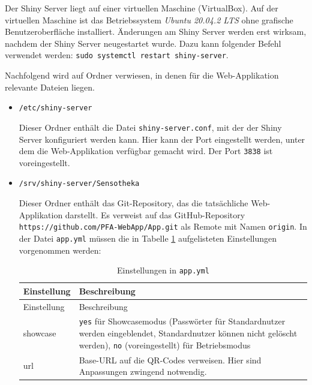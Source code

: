\documentclass[
]{article}
\begin{document}
Der Shiny Server liegt auf einer virtuellen Maschine (VirtualBox). Auf der virtuellen Maschine ist das Betriebssystem \emph{Ubuntu 20.04.2 LTS} ohne grafische Benutzeroberfläche installiert. Änderungen am Shiny Server werden erst wirksam, nachdem der Shiny Server neugestartet wurde. Dazu kann folgender Befehl verwendet werden: \texttt{sudo\ systemctl\ restart\ shiny-server}.

Nachfolgend wird auf Ordner verwiesen, in denen für die Web-Applikation relevante Dateien liegen.

\begin{itemize}
\item
  \texttt{/etc/shiny-server}

  Dieser Ordner enthält die Datei \texttt{shiny-server.conf}, mit der der Shiny Server konfiguriert werden kann. Hier kann der Port eingestellt werden, unter dem die Web-Applikation verfügbar gemacht wird. Der Port \texttt{3838} ist voreingestellt.
\end{itemize}

\begin{itemize}
\item
  \texttt{/srv/shiny-server/Sensotheka}

  Dieser Ordner enthält das Git-Repository, das die tatsächliche Web-Applikation darstellt. Es verweist auf das GitHub-Repository \texttt{https://github.com/PFA-WebApp/App.git} als Remote mit Namen \texttt{origin}. In der Datei \texttt{app.yml} müssen die in Tabelle \ref{tab:app-yml} aufgelisteten Einstellungen vorgenommen werden:

  \begin{longtable}[]{@{}
    >{\raggedright\arraybackslash}p{}
    >{\raggedright\arraybackslash}p{}@{}}
  \caption{\label{tab:app-yml} Einstellungen in \texttt{app.yml}}\tabularnewline
  \toprule
  Einstellung & Beschreibung \\
  \midrule
  \endfirsthead
  \toprule
  Einstellung & Beschreibung \\
  \midrule
  \endhead
  showcase & \texttt{yes} für Showcasemodus (Passwörter für Standardnutzer werden eingeblendet, Standardnutzer können nicht gelöscht werden), \texttt{no} (voreingestellt) für Betriebsmodus \\
  url & Base-URL auf die QR-Codes verweisen. Hier sind Anpassungen zwingend notwendig. \\
  \bottomrule
  \end{longtable}
\end{itemize}
\end{document}
